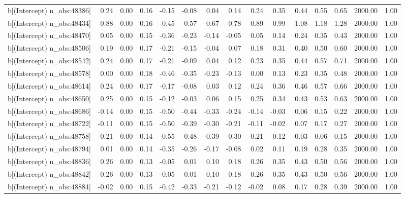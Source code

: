 \begin{table}[ht]
\begin{tabular}{rrrrrrrrrrrrrrr}
  b[(Intercept) n\_obs:48386] & 0.24 & 0.00 & 0.16 & -0.15 & -0.08 & 0.04 & 0.14 & 0.24 & 0.35 & 0.44 & 0.55 & 0.65 & 2000.00 & 1.00 \\ 
  b[(Intercept) n\_obs:48434] & 0.88 & 0.00 & 0.16 & 0.45 & 0.57 & 0.67 & 0.78 & 0.89 & 0.99 & 1.08 & 1.18 & 1.28 & 2000.00 & 1.00 \\ 
  b[(Intercept) n\_obs:48470] & 0.05 & 0.00 & 0.15 & -0.36 & -0.23 & -0.14 & -0.05 & 0.05 & 0.14 & 0.24 & 0.35 & 0.43 & 2000.00 & 1.00 \\ 
  b[(Intercept) n\_obs:48506] & 0.19 & 0.00 & 0.17 & -0.21 & -0.15 & -0.04 & 0.07 & 0.18 & 0.31 & 0.40 & 0.50 & 0.60 & 2000.00 & 1.00 \\ 
  b[(Intercept) n\_obs:48542] & 0.24 & 0.00 & 0.17 & -0.21 & -0.09 & 0.04 & 0.12 & 0.23 & 0.35 & 0.44 & 0.57 & 0.71 & 2000.00 & 1.00 \\ 
  b[(Intercept) n\_obs:48578] & 0.00 & 0.00 & 0.18 & -0.46 & -0.35 & -0.23 & -0.13 & 0.00 & 0.13 & 0.23 & 0.35 & 0.48 & 2000.00 & 1.00 \\ 
  b[(Intercept) n\_obs:48614] & 0.24 & 0.00 & 0.17 & -0.17 & -0.08 & 0.03 & 0.12 & 0.24 & 0.36 & 0.46 & 0.57 & 0.66 & 2000.00 & 1.00 \\ 
  b[(Intercept) n\_obs:48650] & 0.25 & 0.00 & 0.15 & -0.12 & -0.03 & 0.06 & 0.15 & 0.25 & 0.34 & 0.43 & 0.53 & 0.63 & 2000.00 & 1.00 \\ 
  b[(Intercept) n\_obs:48686] & -0.14 & 0.00 & 0.15 & -0.50 & -0.44 & -0.33 & -0.24 & -0.14 & -0.03 & 0.06 & 0.15 & 0.22 & 2000.00 & 1.00 \\ 
  b[(Intercept) n\_obs:48722] & -0.11 & 0.00 & 0.15 & -0.50 & -0.39 & -0.30 & -0.21 & -0.11 & -0.02 & 0.07 & 0.17 & 0.27 & 2000.00 & 1.00 \\ 
  b[(Intercept) n\_obs:48758] & -0.21 & 0.00 & 0.14 & -0.55 & -0.48 & -0.39 & -0.30 & -0.21 & -0.12 & -0.03 & 0.06 & 0.15 & 2000.00 & 1.00 \\ 
  b[(Intercept) n\_obs:48794] & 0.01 & 0.00 & 0.14 & -0.35 & -0.26 & -0.17 & -0.08 & 0.02 & 0.11 & 0.19 & 0.28 & 0.35 & 2000.00 & 1.00 \\ 
  b[(Intercept) n\_obs:48836] & 0.26 & 0.00 & 0.13 & -0.05 & 0.01 & 0.10 & 0.18 & 0.26 & 0.35 & 0.43 & 0.50 & 0.56 & 2000.00 & 1.00 \\ 
  b[(Intercept) n\_obs:48842] & 0.26 & 0.00 & 0.13 & -0.05 & 0.01 & 0.10 & 0.18 & 0.26 & 0.35 & 0.43 & 0.50 & 0.56 & 2000.00 & 1.00 \\ 
  b[(Intercept) n\_obs:48884] & -0.02 & 0.00 & 0.15 & -0.42 & -0.33 & -0.21 & -0.12 & -0.02 & 0.08 & 0.17 & 0.28 & 0.39 & 2000.00 & 1.00 \\ 

\end{tabular}
\end{table}

